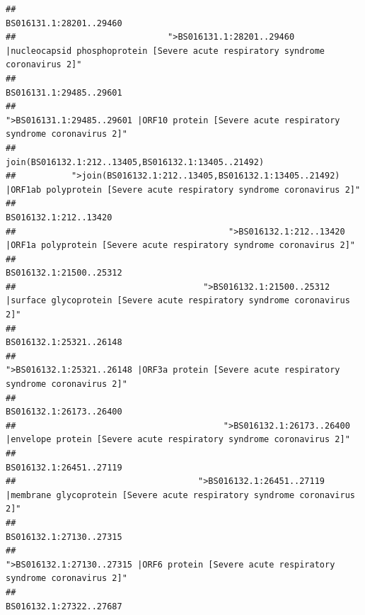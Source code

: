 \documentclass[
]{article}
\begin{document}
\begin{verbatim}
##                                                                                                                BS016131.1:28201..29460 
##                              ">BS016131.1:28201..29460 |nucleocapsid phosphoprotein [Severe acute respiratory syndrome coronavirus 2]" 
##                                                                                                                BS016131.1:29485..29601 
##                                            ">BS016131.1:29485..29601 |ORF10 protein [Severe acute respiratory syndrome coronavirus 2]" 
##                                                                                    join(BS016132.1:212..13405,BS016132.1:13405..21492) 
##           ">join(BS016132.1:212..13405,BS016132.1:13405..21492) |ORF1ab polyprotein [Severe acute respiratory syndrome coronavirus 2]" 
##                                                                                                                  BS016132.1:212..13420 
##                                          ">BS016132.1:212..13420 |ORF1a polyprotein [Severe acute respiratory syndrome coronavirus 2]" 
##                                                                                                                BS016132.1:21500..25312 
##                                     ">BS016132.1:21500..25312 |surface glycoprotein [Severe acute respiratory syndrome coronavirus 2]" 
##                                                                                                                BS016132.1:25321..26148 
##                                            ">BS016132.1:25321..26148 |ORF3a protein [Severe acute respiratory syndrome coronavirus 2]" 
##                                                                                                                BS016132.1:26173..26400 
##                                         ">BS016132.1:26173..26400 |envelope protein [Severe acute respiratory syndrome coronavirus 2]" 
##                                                                                                                BS016132.1:26451..27119 
##                                    ">BS016132.1:26451..27119 |membrane glycoprotein [Severe acute respiratory syndrome coronavirus 2]" 
##                                                                                                                BS016132.1:27130..27315 
##                                             ">BS016132.1:27130..27315 |ORF6 protein [Severe acute respiratory syndrome coronavirus 2]" 
##                                                                                                                BS016132.1:27322..27687 

\end{verbatim}
\end{document}
